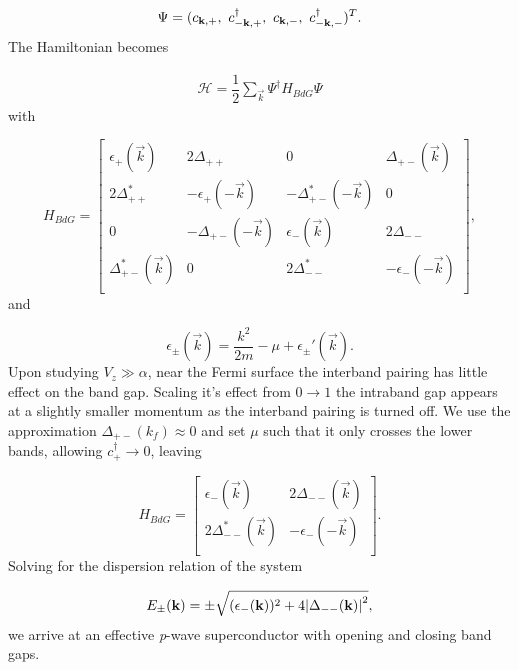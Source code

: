 \begin{align}
  \Psi = (c_{\vec{k},+},\ \cc_{-\vec{k},+},\ c_{\vec{k},-},\ \cc_{-\vec{k},-} )^T.
\end{align}
The Hamiltonian becomes

\begin{align}
  \mathcal{H} = \dfrac{1}{2}\sum_{\vec{k}} \Psi^{\dagger}H_{BdG}\Psi
\end{align}
with

\begin{equation}
  H_{BdG} =
  \begin{bmatrix}
    \epsilon_+(\vec{k}) & 2\Delta_{++} & 0 & \Delta_{+-}(\vec{k}) \\
    2\Delta_{++}^* & -\epsilon_+(-\vec{k}) & -\Delta_{+-}^*(-\vec{k}) & 0 \\
    0 & -\Delta_{+-}(-\vec{k}) & \epsilon_-(\vec{k}) & 2\Delta_{- -} \\
    \Delta_{+-}^*(\vec{k}) & 0 & 2\Delta_{- -}^* & -\epsilon_-(-\vec{k}) \\
  \end{bmatrix},
\end{equation}
and

\begin{equation}
  \epsilon_{\pm}(\vec{k}) = \dfrac{k^2}{2m} - \mu + \epsilon_{\pm}'(\vec{k}).
\end{equation}
Upon studying $V_z \gg \alpha$, near the Fermi surface the interband pairing has little effect on the band gap.
Scaling it's effect from $0 \to 1$ the intraband gap appears at a slightly smaller momentum as the interband pairing is turned off.
We use the approximation $\Delta_{+-}(k_f) \approx 0$ and set $\mu$ such that it only crosses the lower bands, allowing $c_+^{\dagger} \to 0$, leaving

\begin{equation}
  H_{BdG} =
  \begin{bmatrix}
    \epsilon_-(\vec{k}) & 2\Delta_{- -}(\vec{k}) \\
    2\Delta_{- -}^*(\vec{k}) & -\epsilon_-(-\vec{k}) \\
  \end{bmatrix}.
\end{equation}
Solving for the dispersion relation of the system

\begin{align}
  E_{\pm}(\mathbf{k}) = \pm \sqrt{(\epsilon_-(\mathbf{k}))^2+4\abs{\Delta_{- -}(\mathbf{k})}^2},
\end{align}
 we arrive at an effective \textit{p}-wave superconductor with opening and closing band gaps.
